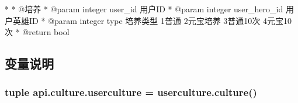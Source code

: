 \begin{DoxyVerb}*
 * @培养
* @param integer user_id 用户ID
* @param integer user_hero_id 用户英雄ID
* @param integer type 培养类型 1普通 2元宝培养 3普通10次 4元宝10次
* @return bool
\end{DoxyVerb}
 

\subsection{变量说明}
\hypertarget{namespaceapi_1_1culture_a1a84cfd49a176913558950d24000254a}{
\subsubsection[{userculture}]{\setlength{\rightskip}{0pt plus 5cm}tuple api.\-culture.\-userculture = userculture.\-culture()}}\label{namespaceapi_1_1culture_a1a84cfd49a176913558950d24000254a}
